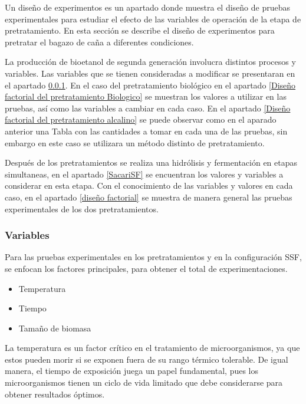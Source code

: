 \documentclass[12pt]{article}
\begin{document}
	Un diseño de experimentos es un apartado donde muestra 	el diseño de pruebas experimentales para estudiar el efecto de las variables de operación de la etapa de pretratamiento. En esta sección se describe el diseño de experimentos para pretratar el bagazo de caña a diferentes condiciones.
	
	La producción de bioetanol de segunda generación involucra distintos procesos y variables. Las variables que se tienen consideradas a modificar se presentaran en el apartado \ref{variables}. En el caso del pretratamiento biológico en el apartado \ref{Diseño factorial del pretratamiento Biologico} se muestran los valores a utilizar en las  pruebas, así como las variables a cambiar en cada caso. En el apartado \ref{Diseño factorial del pretratamiento alcalino} se puede observar como en el aparado anterior una Tabla con las cantidades a tomar en cada una de las pruebas, sin embargo en este caso se utilizara un método distinto de pretratamiento.
	
   Después de los pretratamientos se realiza una hidrólisis y fermentación en etapas simultaneas, en el apartado \ref{SacariSF} se encuentran los valores y variables a considerar en esta etapa. Con el conocimiento de las variables y valores en cada caso, en el apartado \ref{diseño factorial} se muestra de manera general las pruebas experimentales de los dos pretratamientos.
	
	
 		\subsubsection{Variables}
		\label{variables}
		
		Para las pruebas experimentales en los pretratamientos y en la configuración SSF, se enfocan los factores principales, para obtener el total de experimentaciones.
		
		
		\begin{itemize}
			\item Temperatura
			\item Tiempo
			\item Tamaño de biomasa
		\end{itemize}
		
		
		La temperatura es un factor crítico en el tratamiento de microorganismos, ya que estos pueden morir si se exponen fuera de su rango térmico tolerable. De igual manera, el tiempo de exposición juega un papel fundamental, pues los microorganismos tienen un ciclo de vida limitado que debe considerarse para obtener resultados óptimos.
		
\end{document}
